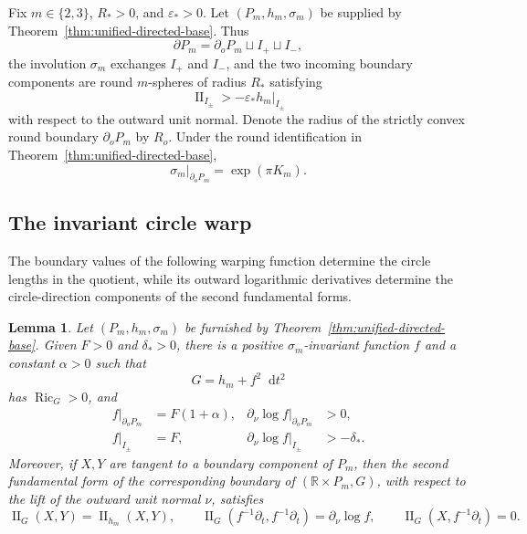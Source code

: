 \documentclass[11pt,reqno]{amsart}
\newtheorem{lemma}[theorem]{Lemma}
\theoremstyle{definition}
\numberwithin{equation}{section}
\DeclareMathOperator{\Ric}{Ric}
\DeclareMathOperator{\II}{II}
\newcommand{\dd}{\mathop{}\!\mathrm d}
\begin{document}
Fix \(m\in\{2,3\}\), \(R_*>0\), and \(\varepsilon_*>0\).  Let
\((P_m,h_m,\sigma_m)\) be supplied by
Theorem~\ref{thm:unified-directed-base}.  Thus
\[
             \partial P_m=\partial_oP_m\sqcup I_+\sqcup I_-,
\]
the involution $\sigma_m$ exchanges $I_+$ and $I_-$, and the two incoming
boundary components are round $m$-spheres of radius $R_*$ satisfying
\[
 \II_{I_\pm}>-\varepsilon_*h_m|_{I_\pm}
\]
with respect to the outward unit normal.  Denote the radius of the
strictly convex round boundary $\partial_oP_m$ by $R_o$.  Under the
round identification in Theorem~\ref{thm:unified-directed-base},
\[
 \sigma_m|_{\partial_oP_m}=\exp(\pi K_m).
\]

\subsection{The invariant circle warp}

The boundary values of the following warping function determine the
circle lengths in the quotient, while its outward logarithmic
derivatives determine the circle-direction components of the second
fundamental forms.

\begin{lemma}\label{lem:un-warp}
Let \((P_m,h_m,\sigma_m)\) be furnished by
Theorem~\ref{thm:unified-directed-base}.  Given \(F>0\) and
\(\delta_*>0\), there is a positive \(\sigma_m\)-invariant function \(f\)
and a constant \(\alpha>0\)
such that
\[
                         G=h_m+f^2\dd t^2
\]
has \(\Ric_G>0\), and
\begin{align}
 f|_{\partial_oP_m}&=F(1+\alpha),&
 \partial_\nu\log f|_{\partial_oP_m}&>0,
 \label{eq:un-warp-outer}\\
 f|_{I_\pm}&=F,&
 \partial_\nu\log f|_{I_\pm}&>-\delta_*.
 \label{eq:un-warp-inner}
\end{align}
Moreover, if \(X,Y\) are tangent to a boundary component of \(P_m\),
then the second fundamental form of the
corresponding boundary of \((\mathbb R\times P_m,G)\), with respect to
the lift of the outward unit normal \(\nu\), satisfies
\begin{equation}\label{eq:un-warp-second-fundamental-form}
 \II_G(X,Y)=\II_{h_m}(X,Y),\qquad
 \II_G(f^{-1}\partial_t,f^{-1}\partial_t)=\partial_\nu\log f,
 \qquad \II_G(X,f^{-1}\partial_t)=0.
\end{equation}
\end{lemma}
\end{document}
